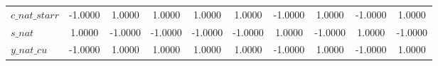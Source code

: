 \begin{center}
\begin{longtable}{lccccccccc}
$c\_nat\_starr  $	 & 	          -1.0000	 & 	           1.0000	 & 	           1.0000	 & 	           1.0000	 & 	           1.0000	 & 	          -1.0000	 & 	           1.0000	 & 	          -1.0000	 & 	           1.0000 \\ 
$s\_nat         $	 & 	           1.0000	 & 	          -1.0000	 & 	          -1.0000	 & 	          -1.0000	 & 	          -1.0000	 & 	           1.0000	 & 	          -1.0000	 & 	           1.0000	 & 	          -1.0000 \\ 
$y\_nat\_cu     $	 & 	          -1.0000	 & 	           1.0000	 & 	           1.0000	 & 	           1.0000	 & 	           1.0000	 & 	          -1.0000	 & 	           1.0000	 & 	          -1.0000	 & 	           1.0000 \\ 
\end{longtable}
 \end{center}
